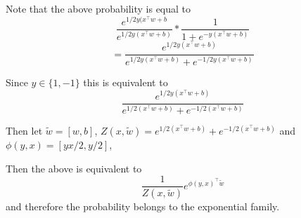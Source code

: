\documentclass{article}
\begin{document}
\begin{enumerate}
\color{blue}
Note that the above probability is equal to 
$$
\frac{e^{1/2 y(x^\top w + b}}{e^{1/2 y(x^\top w + b)}} * \frac{1}{1+e^{-y (x^\top w + b)}}
$$
$$
= \frac{e^{1/2 y(x^\top w + b)}}{e^{1/2 y(x^\top w + b)} +e^{-1/2 y(x^\top w + b)} }
$$

Since $y \in \{1, -1\}$ this is equivalent to 
$$
\frac{e^{1/2 y(x^\top w + b)}}{e^{1/2(x^\top w + b)} +e^{-1/2(x^\top w + b)} }
$$

Then let $\tilde w = [w,b]$, $Z(x,\tilde w) = e^{1/2(x^\top w + b)} +e^{-1/2(x^\top w + b)}$ and $\phi(y,x) = [yx/2, y/2]$,

Then the above is equivalent to 
$$
\frac{1}{Z(x,\tilde w)} e^{\phi(y,x)^\top \tilde w}
$$
and therefore the probability belongs to the exponential family.

\color{black}

\end{enumerate}
\end{document}
